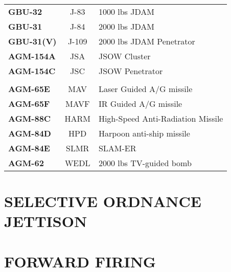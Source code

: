 \documentclass[fontInter]{TechCheck}
\begin{document}
\begin{center}
\begin{tabular}{l | c | p{6cm}}
			\textbf{GBU-32} & J-83 & 1000 lbs JDAM \\
			\textbf{GBU-31} & J-84 & 2000 lbs JDAM \\
			\textbf{GBU-31(V)} & J-109 & 2000 lbs JDAM Penetrator \\
			\midrule
			\textbf{AGM-154A} & JSA & JSOW Cluster \\
			\textbf{AGM-154C} & JSC & JSOW Penetrator \\
			\midrule
			\multicolumn{3}{c}{\blue{A/G Missiles}} \\
			\midrule
			\textbf{AGM-65E} & MAV & Laser Guided A/G missile\\
			\textbf{AGM-65F} & MAVF & IR Guided A/G missile\\
			\midrule
			\textbf{AGM-88C} & HARM & High-Speed Anti-Radiation Missile\\
			\midrule
			\textbf{AGM-84D} & HPD & Harpoon anti-ship missile \\
			\textbf{AGM-84E} & SLMR & SLAM-ER \\
			\midrule
			\textbf{AGM-62} & WEDL & 2000 lbs TV-guided bomb \\
			\bottomrule
		\end{tabular}
	\end{center}

	\clearpage

	\section{SELECTIVE ORDNANCE JETTISON}
	\begin{checklistenumerate}
	\end{checklistenumerate}

	\section{FORWARD FIRING}
\end{document}
